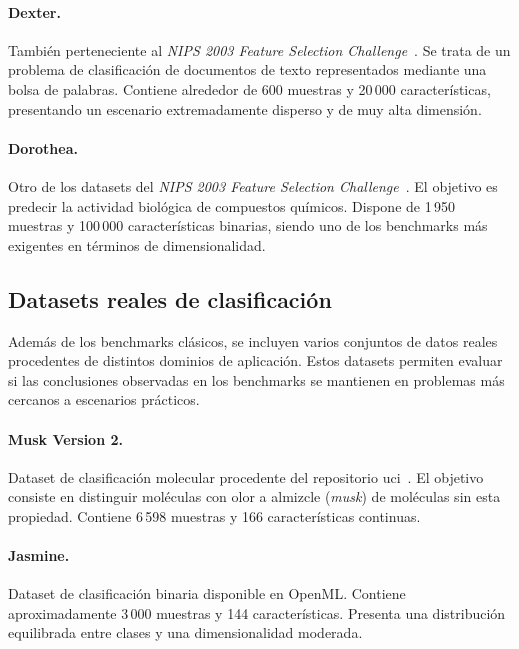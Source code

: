 \paragraph{Dexter.}
También perteneciente al \textit{NIPS 2003 Feature Selection Challenge}~\cite{guyon2004result}. Se trata de un problema de clasificación de documentos de texto representados mediante una bolsa de palabras. Contiene alrededor de 600 muestras y 20\,000 características, presentando un escenario extremadamente disperso y de muy alta dimensión.

\paragraph{Dorothea.}
Otro de los datasets del \textit{NIPS 2003 Feature Selection Challenge}~\cite{guyon2004result}. El objetivo es predecir la actividad biológica de compuestos químicos. Dispone de 1\,950 muestras y 100\,000 características binarias, siendo uno de los benchmarks más exigentes en términos de dimensionalidad.

\subsection{Datasets reales de clasificación}
\label{subsec:reales}

Además de los benchmarks clásicos, se incluyen varios conjuntos de datos reales procedentes de distintos dominios de aplicación. Estos datasets permiten evaluar si las conclusiones observadas en los benchmarks se mantienen en problemas más cercanos a escenarios prácticos.

\paragraph{Musk Version 2.}
Dataset de clasificación molecular procedente del repositorio \acrshort{uci}~\cite{lichman2013uci}. El objetivo consiste en distinguir moléculas con olor a almizcle (\textit{musk}) de moléculas sin esta propiedad. Contiene 6\,598 muestras y 166 características continuas.

\paragraph{Jasmine.}
Dataset de clasificación binaria disponible en OpenML. Contiene aproximadamente 3\,000 muestras y 144 características. Presenta una distribución equilibrada entre clases y una dimensionalidad moderada.

